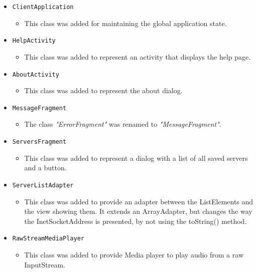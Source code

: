 \documentclass[a4paper,10pt]{scrartcl}
\begin{document}
\begin{itemize}
    \item \lstinline|ClientApplication|
  \begin{itemize}
   \item This class was added for maintaining the global application state.
  \end{itemize}

  \item \lstinline|HelpActivity|
  \begin{itemize}
   \item This class was added to represent an activity that displays the help page.
  \end{itemize}

  \item \lstinline|AboutActivity|
  \begin{itemize}
   \item This class was added to represent the about dialog.
  \end{itemize}

   \item \lstinline|MessageFragment|
  \begin{itemize}
   \item The class \textit{"ErrorFragment"} was renamed to \textit{"MessageFragment"}.
  \end{itemize}

  \item \lstinline|ServersFragment|
  \begin{itemize}
   \item This class was added to represent a dialog with a list of all saved servers and a button.
  \end{itemize}

  \item \lstinline|ServerListAdapter|
  \begin{itemize}
  \item This class was added to provide an adapter between the ListElements and the view showing them. It extends an ArrayAdapter, but changes the way the InetSocketAddress is presented, by not using the toString() method.
  \end{itemize}

  \item \lstinline|RawStreamMediaPlayer|
  \begin{itemize}
  \item This class was added to provide Media player to play audio from a raw InputStream.
  \end{itemize}


\end{itemize}
\end{document}
